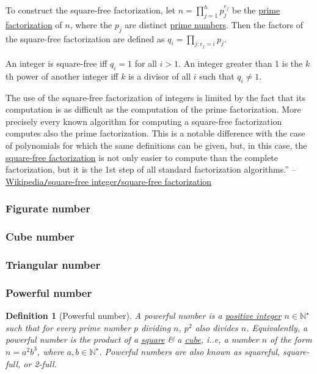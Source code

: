 \documentclass{article}
\newtheorem{definition}{Definition}
\begin{document}
To construct the square-free factorization, let $n = \prod_{j=1}^h p_j^{e_j}$ be the \href{https://en.wikipedia.org/wiki/Prime_factorization}{prime factorization} of $n$, where the $p_j$ are distinct \href{https://en.wikipedia.org/wiki/Prime_number}{prime numbers}. Then the factors of the square-free factorization are defined as $q_i = \prod_{j:e_j = i} p_j$.

An integer is square-free iff $q_i = 1$ for all $i > 1$. An integer greater than 1 is the $k$th power of another integer iff $k$ is a divisor of all $i$ such that $q_i\ne1$.

The use of the square-free factorization of integers is limited by the fact that its computation is as difficult as the computation of the prime factorization. More precisely every known algorithm for computing a square-free factorization computes also the prime factorization. This is a notable difference with the case of polynomials for which the same definitions can be given, but, in this case, the \href{https://en.wikipedia.org/wiki/Square-free_factorization}{square-free factorization} is not only easier to compute than the complete factorization, but it is the 1st step of all standard factorization algorithms.'' -- \href{https://en.wikipedia.org/wiki/Square-free_integer#Square-free_factorization}{Wikipedia{\tt /}square-free integer{\tt /}square-free factorization}

\subsubsection{Figurate number}

\subsubsection{Cube number}

\subsubsection{Triangular number}

\subsubsection{Powerful number}

\begin{definition}[Powerful number]
	A \emph{powerful number} is a \href{https://en.wikipedia.org/wiki/Positive_integer}{positive integer} $n\in\mathbb{N}^\star$ such that for every prime number $p$ dividing $n$, $p^2$ also divides $n$. Equivalently, a powerful number is the product of a \href{https://en.wikipedia.org/wiki/Square_number}{square} \& a \href{https://en.wikipedia.org/wiki/Cube_(arithmetic)}{cube}, i..e, a number $n$ of the form $n = a^2b^3$, where $a,b\in\mathbb{N}^\star$. Powerful numbers are also known as \emph{squareful, square-full}, or \emph{2-full}.
\end{definition}
\end{document}
